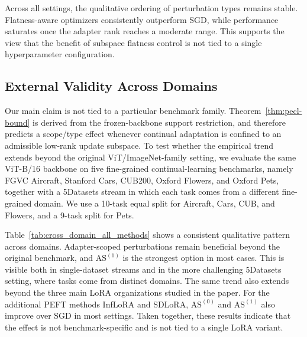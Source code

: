 \documentclass[10pt]{article} %
\begin{document}
Across all settings, the qualitative ordering of perturbation types remains stable.
Flatness-aware optimizers consistently outperform SGD, while performance saturates once the adapter rank reaches a moderate range.
This supports the view that the benefit of subspace flatness control is not tied to a single hyperparameter configuration.

\subsection{External Validity Across Domains}
\label{sec:external-domain}

Our main claim is not tied to a particular benchmark family.
Theorem~\ref{thm:pecl-bound} is derived from the frozen-backbone support restriction, and therefore predicts a scope/type effect whenever continual adaptation is confined to an admissible low-rank update subspace.
To test whether the empirical trend extends beyond the original ViT/ImageNet-family setting, we evaluate the same ViT-B/16 backbone on five fine-grained continual-learning benchmarks, namely FGVC Aircraft, Stanford Cars, CUB200, Oxford Flowers, and Oxford Pets, together with a 5Datasets stream in which each task comes from a different fine-grained domain.
We use a 10-task equal split for Aircraft, Cars, CUB, and Flowers, and a 9-task split for Pets.

Table~\ref{tab:cross_domain_all_methods} shows a consistent qualitative pattern across domains.
Adapter-scoped perturbations remain beneficial beyond the original benchmark, and $\mathrm{AS}^{(1)}$ is the strongest option in most cases.
This is visible both in single-dataset streams and in the more challenging 5Datasets setting, where tasks come from distinct domains.
The same trend also extends beyond the three main LoRA organizations studied in the paper.
For the additional PEFT methods InfLoRA and SDLoRA, $\mathrm{AS}^{(0)}$ and $\mathrm{AS}^{(1)}$ also improve over SGD in most settings.
Taken together, these results indicate that the effect is not benchmark-specific and is not tied to a single LoRA variant.
\end{document}
